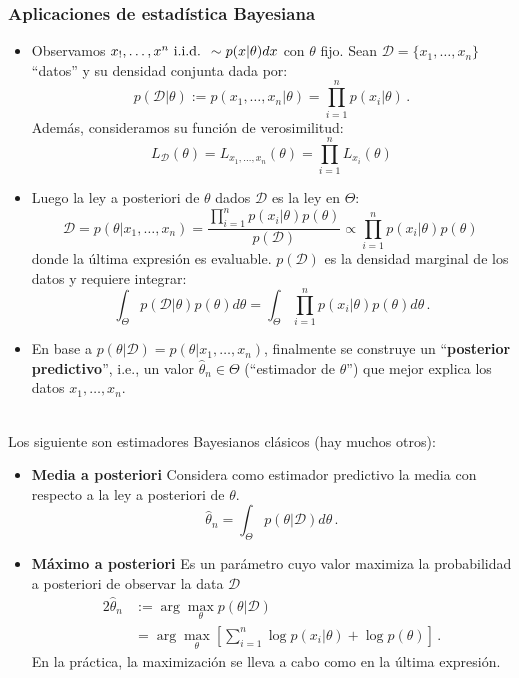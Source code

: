 \subsubsection{Aplicaciones de estadística Bayesiana}
\begin{itemize}
    \item Observamos $x_!,\dots,x^n \mbox{ i.i.d. } \sim p(x|\theta)dx$ con $\theta$ fijo.
    \newline Sean $\mathcal{D}=\{x_1,\dots,x_n\}$ ``datos'' y su densidad conjunta dada por:
    $$ p(\mathcal{D}|\theta):=p(x_1,\dots,x_n|\theta)=\displaystyle\prod^n_{i=1}p(x_i|\theta)\, . $$
    Además,  consideramos su función de verosimilitud:
    $$ L_\mathcal{D}(\theta)=L_{x_1,\dots,x_n}(\theta)=\displaystyle\prod^n_{i=1}L_{x_i}(\theta)$$
    \item Luego la ley a posteriori de $\theta$ dados $\mathcal{D}$ es la ley en $\Theta$: $$\mathcal{D}=p(\theta|x_1,\dots,x_n)=\displaystyle\frac{\prod^n_{i=1}p(x_i|\theta)p(\theta)}{p(\mathcal{D})}\propto \prod^n_{i=1}p(x_i|\theta)p(\theta)\,$$
    donde la última expresión es evaluable.  $p(\mathcal{D})$ es la densidad marginal de los datos y requiere integrar:
    $$ \displaystyle \int_\Theta p(\mathcal{D}|\theta)p(\theta)d\theta=\int_\Theta\prod^n_{i=1}p(x_i|\theta)p(\theta)d\theta\,.$$
    \item En base a $p(\theta|\mathcal{D})=p(\theta|x_1,\dots,x_n)$, finalmente se construye un ``\textbf{posterior predictivo}'', i.e., un valor $\hat{\theta}_n\in\Theta$ (``estimador de $\theta$'') que mejor explica los datos $x_1,\dots,x_n$.
\end{itemize}
\vspace{1cm}\\
Los siguiente son estimadores Bayesianos clásicos (hay muchos otros):
\begin{itemize}
    \item \textbf{Media a posteriori}
    \newline Considera  como estimador predictivo la media con respecto a la ley a posteriori de $\theta$.
    $$ \hat{\theta}_n = \displaystyle\int_\Theta p(\theta|\mathcal{D})d\theta\,.$$
    \item \textbf{Máximo a posteriori}
    \newline Es un par\'ametro cuyo  valor  maximiza la probabilidad a posteriori de observar la data $\mathcal{D}$
    \begin{alignat*}{2}
        \hat{\theta}_n & := \displaystyle\arg\max_{\theta} p(\theta|\mathcal{D})\\
         & = \arg\max_{\theta}[\sum^n_{i=1}\log p(x_i|\theta)+\log p(\theta)]\,.
    \end{alignat*}
    En la práctica, la maximización se lleva a cabo como en la última expresión.
\end{itemize}
